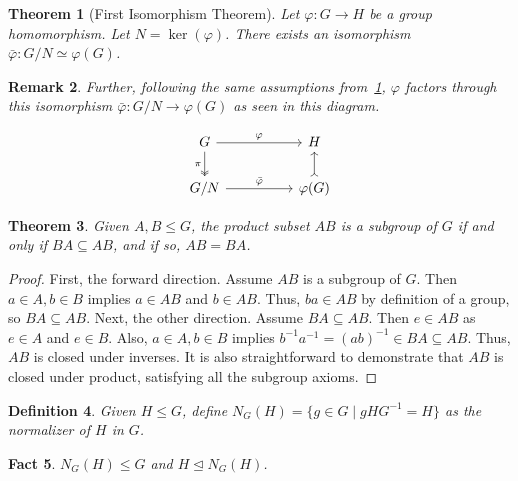 \documentclass[a4paper,12pt]{article}
\theoremstyle{sltheorem}
\newtheorem{theorem}{Theorem}[section]
\newtheorem{definition}[theorem]{Definition}
\newtheorem{remark}[theorem]{Remark}
\newtheorem{fact}[theorem]{Fact}
\begin{document}
\begin{theorem}[First Isomorphism Theorem]\label{first_iso_thm}
    Let $\varphi: G \rightarrow H$ be a group homomorphism. Let $N = \ker{(\varphi)}$. There exists an isomorphism $\bar{\varphi}: G/N \simeq \varphi(G)$.
\end{theorem}

\begin{remark}
Further, following the same assumptions from~\ref{first_iso_thm}, $\varphi$ factors through this isomorphism $\bar{\varphi}: G/N \rightarrow \varphi(G)$ as seen in this diagram.

\[\begin{tikzcd}
	G && H \\
	{G/N} && {\varphi(G)}
	\arrow["\varphi", from=1-1, to=1-3]
	\arrow["\pi"', two heads, from=1-1, to=2-1]
	\arrow["\bar{\varphi}", from=2-1, to=2-3]
	\arrow[tail, from=2-3, to=1-3]
\end{tikzcd}\]
\end{remark}

\begin{theorem}\label{product_subset_thm}
    Given $A, B \leq G$, the product subset $AB$ is a subgroup of $G$ if and only if $BA \subseteq AB$, and if so, $AB = BA$.
\end{theorem}

\begin{proof}
    First, the forward direction. Assume $AB$ is a subgroup of $G$. Then $a \in A, b \in B$ implies $a \in AB$ and $b \in AB$. Thus, $ba \in AB$ by definition of a group, so $BA \subseteq AB$. 
    Next, the other direction. Assume $BA \subseteq AB$. Then $e \in AB$ as $e \in A$ and $e \in B$. Also, $a \in A, b \in B$ implies $b^{-1} a^{-1} = {(ab)}^{-1} \in BA \subseteq AB$. Thus, $AB$ is closed under inverses. It is also straightforward to demonstrate that $AB$ is closed under product, satisfying all the subgroup axioms.
\end{proof}

\begin{definition}
    Given $H \leq G$, define $N_G(H) = \{g \in G \mid gHG^{-1} = H\}$ as the \textit{normalizer} of $H$ in $G$. 
\end{definition}

\begin{fact}
    $N_G(H) \leq G$ and $H \trianglelefteq N_G(H)$.
\end{fact}
\end{document}

